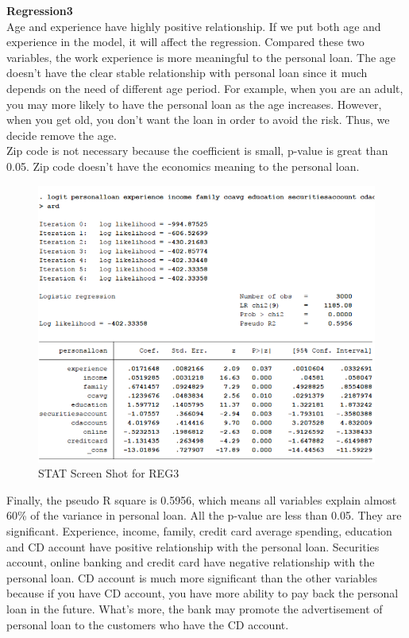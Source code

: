\documentclass[]{article}
\begin{document}
\textbf{Regression3}\\
Age and experience have highly positive relationship. If we put both age and experience in the model, it will affect the regression. Compared these two variables, the work experience is more meaningful to the personal loan. The age doesn’t have the clear stable relationship with personal loan since it much depends on the need of different age period. For example, when you are an adult, you may more likely to have the personal loan as the age increases. However, when you get old, you don’t want the loan in order to avoid the risk. Thus, we decide remove the age. \\
Zip code is not necessary because the coefficient is small, p-value is great than 0.05. Zip code doesn’t have the economics meaning to the personal loan. 
\begin{figure}[H]
	\centering
	\includegraphics[width=1\linewidth,height=1\textheight]{tem_files/figure-latex/REG3.pdf}
	\caption{STAT Screen Shot for REG3}	
\end{figure}
Finally, the pseudo R square is 0.5956, which means all variables explain almost 60\% of the variance in personal loan. All the p-value are less than 0.05. They are significant. Experience, income, family, credit card average spending, education and CD account have positive relationship with the personal loan. Securities account, online banking and credit card have negative relationship with the personal loan. CD account is much more significant than the other variables because if you have CD account, you have more ability to pay back the personal loan in the future. What’s more, the bank may promote the advertisement of personal loan to the customers who have the CD account.
\end{document}
